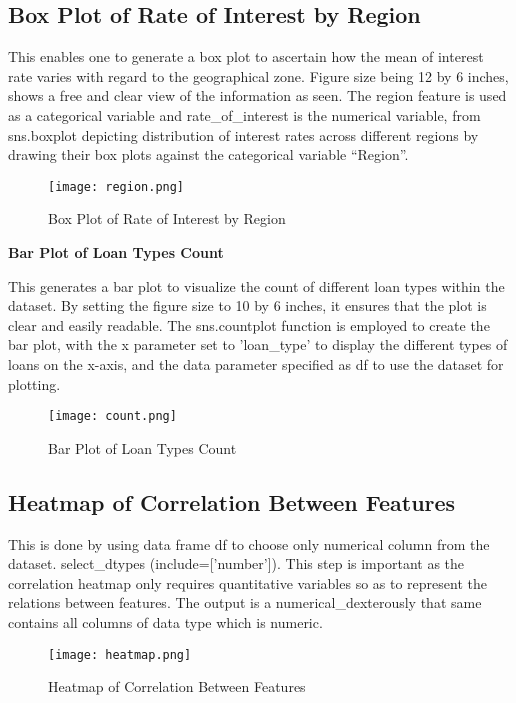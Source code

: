 \documentclass[12pt, a4paper,oneside]{book}
\numberwithin{equation}{section}
\begin{document}
\subsection{Box Plot of Rate of Interest by Region}

This enables one to generate a box plot to ascertain how the mean of interest rate varies with regard to the geographical zone. Figure size being 12 by 6 inches, shows a free and clear view of the information as seen. The region feature is used as a categorical variable and rate\_of\_interest is the numerical variable, from sns.boxplot depicting distribution of interest rates across different regions by drawing their box plots against the categorical variable “Region”.

\begin{figure}[ht]
    \centering
    \texttt{[image: region.png]}
    \caption{Box Plot of Rate of Interest by Region}
    \label{fig:subsubsection}
\end{figure}
\FloatBarrier
\newpage
\textbf{Bar Plot of Loan Types Count}

This generates a bar plot to visualize the count of different loan types within the dataset. By setting the figure size to 10 by 6 inches, it ensures that the plot is clear and easily readable. The sns.countplot function is employed to create the bar plot, with the x parameter set to 'loan\_type' to display the different types of loans on the x-axis, and the data parameter specified as df to use the dataset for plotting.

\begin{figure}[ht]
    \centering
    \texttt{[image: count.png]}  
    \caption{Bar Plot of Loan Types Count}
    \label{fig:subsubsection}
\end{figure}
\FloatBarrier

\subsection{Heatmap of Correlation Between Features}

This is done by using data frame df to choose only numerical column from the dataset. select\_dtypes (include=['number']). This step is important as the correlation heatmap only requires quantitative variables so as to represent the relations between features. The output is a numerical\_dexterously that same contains all columns of data type which is numeric. 

\begin{figure}[ht]
    \centering
    \texttt{[image: heatmap.png]}  
    \caption{Heatmap of Correlation Between Features}
    \label{fig:subsubsection}
\end{figure}
\FloatBarrier
\end{document}
